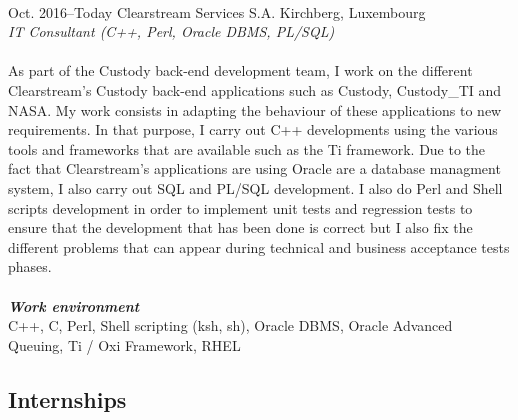 \documentclass[]{friggeri-cv} %
\begin{document}
\begin{entrylist}
\entry
{\\Oct. 2016--Today}
{Clearstream Services S.A.}
{Kirchberg, Luxembourg}
{\\ \emph{IT Consultant (C++, Perl, Oracle DBMS, PL/SQL)} \\ \\
As part of the Custody back-end development team, I work on the different Clearstream's Custody back-end applications such as Custody, Custody\_TI and NASA. My work consists in adapting the behaviour of these applications to new requirements. In that purpose, I carry out C++ developments using the various tools and frameworks that are available such as the Ti framework. Due to the fact that Clearstream's applications are using Oracle are a database managment system, I also carry out SQL and PL/SQL development. I also do Perl and Shell scripts development in order to implement unit tests and regression tests to ensure that the development that has been done is correct but I also fix the different problems that can appear during technical and business acceptance tests phases.  \\ \\
\textit{\textbf{Work environment}}\\
C++, C, Perl, Shell scripting (ksh, sh), Oracle DBMS, Oracle Advanced Queuing, Ti / Oxi Framework, RHEL}


\end{entrylist}

\subsection{Internships}
\end{document}
